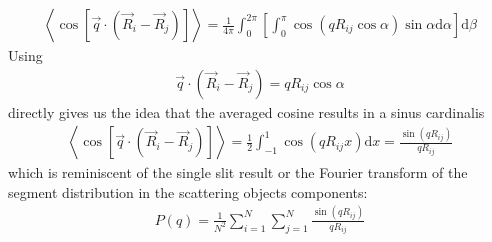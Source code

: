 \documentclass[letterpaper,10pt,english]{sphinxmanual}
\begin{document}
\begin{equation*}
\begin{split}\left\langle\cos \left[\vec{q} \cdot\left(\vec{R}_{i}-\vec{R}_{j}\right)\right]\right\rangle=\frac{1}{4 \pi} \int_{0}^{2 \pi}\left[\int_{0}^{\pi} \cos \left(q R_{i j} \cos \alpha\right) \sin \alpha \mathrm{d} \alpha\right] \mathrm{d} \beta\end{split}
\end{equation*}
\sphinxAtStartPar
Using
\begin{equation*}
\begin{split}\vec{q} \cdot\left(\vec{R}_{i}-\vec{R}_{j}\right)=q R_{i j} \cos \alpha\end{split}
\end{equation*}
\sphinxAtStartPar
directly gives us the idea that the averaged cosine results in a sinus cardinalis
\begin{equation*}
\begin{split}\left\langle\cos \left[\vec{q} \cdot\left(\vec{R}_{i}-\vec{R}_{j}\right)\right]\right\rangle=\frac{1}{2} \int_{-1}^{1} \cos \left(q R_{i j} x\right) \mathrm{d} x=\frac{\sin \left(q R_{i j}\right)}{q R_{i j}}\end{split}
\end{equation*}
\sphinxAtStartPar
which is reminiscent of the single slit result or the Fourier transform of the segment distribution in the scattering objects components:
\begin{equation*}
\begin{split}P(q)=\frac{1}{N^{2}} \sum_{i=1}^{N} \sum_{j=1}^{N} \frac{\sin \left(q R_{i j}\right)}{q R_{i j}}\end{split}
\end{equation*}
\end{document}
